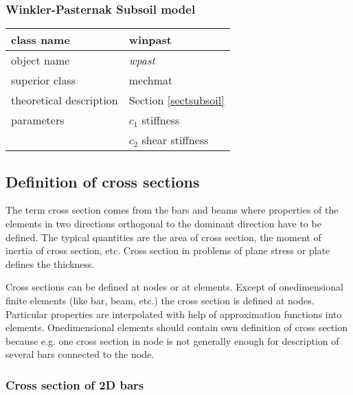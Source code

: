 \subsubsection{Winkler-Pasternak Subsoil model}

\begin{center}
\begin{tabular}{|l|l|}
\hline
class name & {\sf winpast}\index{class!{\sf winpast}}
\\ \hline
object name & {\it wpast}\index{instance!{\it wpast}}
\\ \hline
superior class & {\sf mechmat}
\\ \hline
theoretical description & Section \ref{sectsubsoil}
\\ \hline
parameters & {\it $c_1$ } stiffness
\\
& {\it $c_2$ } shear stiffness
\\ \hline
\end{tabular}
\end{center}


\subsection{Definition of cross sections}

The term cross section comes from the bars and beams where properties of the elements in two
directions orthogonal to the dominant direction have to be defined. The typical quantities
are the area of cross section, the moment of inertia of cross section, etc. Cross section in
problems of plane stress or plate defines the thickness.


Cross sections can be defined at nodes or at elements. Except of onedimensional finite
elements (like bar, beam, etc.) the cross section is defined at nodes. Particular
properties are interpolated with help of approximation functions into elements.
Onedimensional elements should contain own definition of cross section because
e.g. one cross section in node is not generally enough for description of several
bars connected to the node.


\subsubsection{Cross section of 2D bars}

